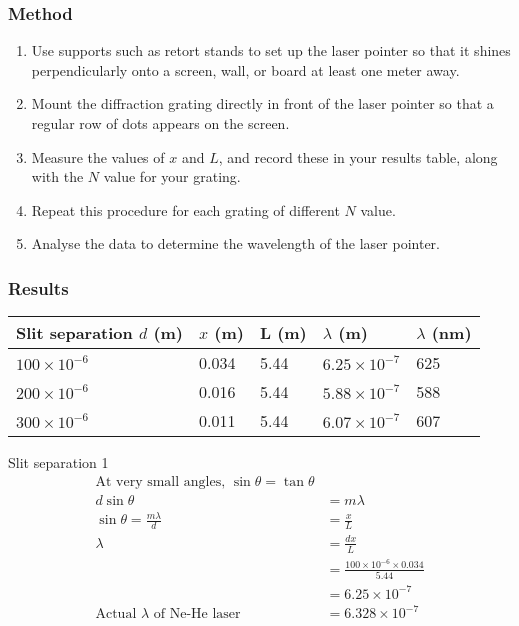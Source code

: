 \documentclass{report}
\begin{document}
		\subsubsection{Method}

			\begin{enumerate}
				\item Use supports such as retort stands to set up the laser pointer so that it shines perpendicularly onto a screen, wall, or board at least one meter away.
				\item Mount the diffraction grating directly in front of the laser pointer so that a regular row of dots appears on the screen.
				\item Measure the values of $x$ and $L$, and record these in your results table, along with the $N$ value for your grating.
				\item Repeat this procedure for each grating of different $N$ value.
				\item Analyse the data to determine the wavelength of the laser pointer.
			\end{enumerate}

		\subsubsection{Results}

			\begin{table}[H]
				\centering
				\begin{tabular}{p{4cm}|p{2cm}|p{2cm}|p{2cm}|p{2cm}}
					Slit separation $d$ (m)		& $x$ (m)	& L (m)		& $\lambda$ (m) 		& $\lambda$ (nm)	\\ \hline
					$100 \times 10^{-6}$		& 0.034		& 5.44		& $6.25 \times 10^{-7}$		& 625			\\
					$200 \times 10^{-6}$		& 0.016		& 5.44		& $5.88 \times 10^{-7}$		& 588			\\
					$300 \times 10^{-6}$		& 0.011		& 5.44		& $6.07 \times 10^{-7}$		& 607			\\
				\end{tabular}
			\end{table}
			
			Slit separation 1
			\begin{align*}
				\text{At very small angles, } \sin{\theta} = \tan{\theta} \\
				d \sin{\theta} &= m \lambda \\
				\sin{\theta} = \frac{m \lambda}{d} &= \frac{x}{L} \\
				\lambda &= \frac{dx}{L} \\
					&= \frac{100 \times 10^{-6} \times 0.034}{5.44} \\
					&= 6.25 \times 10^{-7} \\
			\text{Actual $\lambda$ of Ne-He laser} &= 6.328 \times 10^{-7}
			\end{align*}
\end{document}
